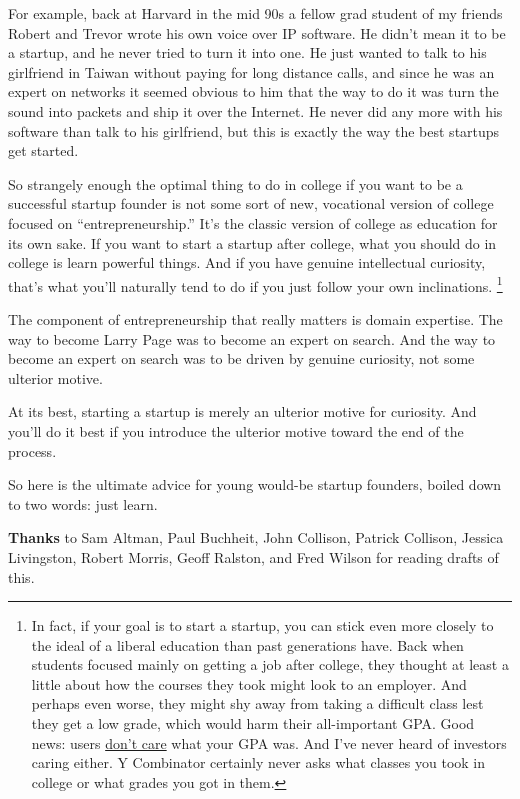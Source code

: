 \documentclass[12pt]{book}
\begin{document}
For example, back at Harvard in the mid 90s a fellow grad student of my
friends Robert and Trevor wrote his own voice over IP software. He
didn't mean it to be a startup, and he never tried to turn it into one.
He just wanted to talk to his girlfriend in Taiwan without paying for
long distance calls, and since he was an expert on networks it seemed
obvious to him that the way to do it was turn the sound into packets and
ship it over the Internet. He never did any more with his software than
talk to his girlfriend, but this is exactly the way the best startups
get started.

So strangely enough the optimal thing to do in college if you want to be
a successful startup founder is not some sort of new, vocational version
of college focused on ``entrepreneurship.'' It's the classic version of
college as education for its own sake. If you want to start a startup
after college, what you should do in college is learn powerful things.
And if you have genuine intellectual curiosity, that's what you'll
naturally tend to do if you just follow your own inclinations.
\footnote{In fact, if your goal is to start a startup, you can stick even
more closely to the ideal of a liberal education than past generations
have. Back when students focused mainly on getting a job after college,
they thought at least a little about how the courses they took might
look to an employer. And perhaps even worse, they might shy away from
taking a difficult class lest they get a low grade, which would harm
their all-important GPA. Good news: users \href{credentials.html}{don't
care} what your GPA was. And I've never heard of investors caring
either. Y Combinator certainly never asks what classes you took in
college or what grades you got in them.}

The component of entrepreneurship that really matters is domain
expertise. The way to become Larry Page was to become an expert on
search. And the way to become an expert on search was to be driven by
genuine curiosity, not some ulterior motive.

At its best, starting a startup is merely an ulterior motive for
curiosity. And you'll do it best if you introduce the ulterior motive
toward the end of the process.

So here is the ultimate advice for young would-be startup founders,
boiled down to two words: just learn.


\textbf{Thanks} to Sam Altman, Paul Buchheit, John Collison, Patrick
Collison, Jessica Livingston, Robert Morris, Geoff Ralston, and Fred
Wilson for reading drafts of this.
\end{document}
